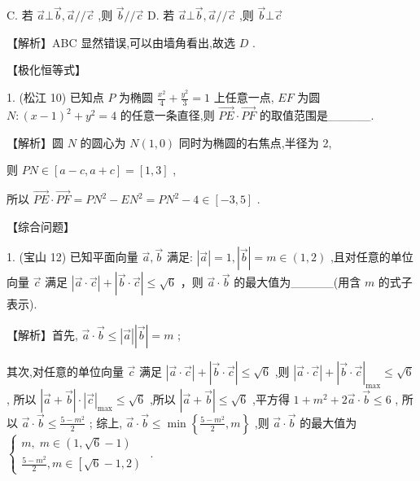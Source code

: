 \documentclass[10pt]{article}
\begin{document}
C. 若 \(\overrightarrow{a} \bot  \overrightarrow{b},\overrightarrow{a}//\overrightarrow{c}\) ,则 \(\overrightarrow{b}//\overrightarrow{c}\) D. 若 \(\overrightarrow{a} \bot  \overrightarrow{b},\overrightarrow{a}//\overrightarrow{c}\) ,则 \(\overrightarrow{b} \bot  \overrightarrow{c}\)

【解析】ABC 显然错误,可以由墙角看出,故选 \(D\) .

【极化恒等式】

1. (松江 10) 已知点 \(P\) 为椭圆 \(\frac{{x}^{2}}{4} + \frac{{y}^{2}}{3} = 1\) 上任意一点, \({EF}\) 为圆 \(N : {\left( x - 1\right) }^{2} + {y}^{2} = 4\) 的任意一条直径,则 \(\overrightarrow{PE} \cdot  \overrightarrow{PF}\) 的取值范围是\_\_\_\_\_.

【解析】圆 \(N\) 的圆心为 \(N\left( {1,0}\right)\) 同时为椭圆的右焦点,半径为 2,

则 \({PN} \in  \left\lbrack  {a - c,a + c}\right\rbrack   = \left\lbrack  {1,3}\right\rbrack\) ,

所以 \(\overrightarrow{PE} \cdot  \overrightarrow{PF} = P{N}^{2} - E{N}^{2} = P{N}^{2} - 4 \in  \left\lbrack  {-3,5}\right\rbrack\) .

【综合问题】

1. (宝山 12) 已知平面向量 \(\overrightarrow{a},\overrightarrow{b}\) 满足: \(\left| \overrightarrow{a}\right|  = 1,\left| \overrightarrow{b}\right|  = m \in  \left( {1,2}\right)\) ,且对任意的单位向量 \(\overrightarrow{c}\) 满足 \(\left| {\overrightarrow{a} \cdot  \overrightarrow{c}}\right|  + \left| {\overrightarrow{b} \cdot  \overrightarrow{c}}\right|  \leq  \sqrt{6}\) ，则 \(\overrightarrow{a} \cdot  \overrightarrow{b}\) 的最大值为\_\_\_\_\_(用含 \(m\) 的式子表示).

【解析】首先, \(\overrightarrow{a} \cdot  \overrightarrow{b} \leq  \left| \overrightarrow{a}\right| \left| \overrightarrow{b}\right|  = m\) ;

其次,对任意的单位向量 \(\overrightarrow{c}\) 满足 \(\left| {\overrightarrow{a} \cdot  \overrightarrow{c}}\right|  + \left| {\overrightarrow{b} \cdot  \overrightarrow{c}}\right|  \leq  \sqrt{6}\) ,则 \(\left| {\overrightarrow{a} \cdot  \overrightarrow{c}}\right|  + {\left| \overrightarrow{b} \cdot  \overrightarrow{c}\right| }_{\max } \leq  \sqrt{6}\) , 所以 \(\left| {\overrightarrow{a} + \overrightarrow{b}}\right|  \cdot  {\left| \overrightarrow{c}\right| }_{\max } \leq  \sqrt{6}\) ,所以 \(\left| {\overrightarrow{a} + \overrightarrow{b}}\right|  \leq  \sqrt{6}\) ,平方得 \(1 + {m}^{2} + 2\overrightarrow{a} \cdot  \overrightarrow{b} \leq  6\) , 所以 \(\overrightarrow{a} \cdot  \overrightarrow{b} \leq  \frac{5 - {m}^{2}}{2}\) ; 综上, \(\overrightarrow{a} \cdot  \overrightarrow{b} \leq  \min \left\{  {\frac{5 - {m}^{2}}{2},m}\right\}\) ,则 \(\overrightarrow{a} \cdot  \overrightarrow{b}\) 的最大值为 \(\left\{  \begin{matrix} m,\;m \in  \left( {1,\sqrt{6} - 1}\right) \\  \frac{5 - {m}^{2}}{2},m \in  \left\lbrack  {\sqrt{6} - 1,2}\right)  \end{matrix}\right.\) .
\end{document}
